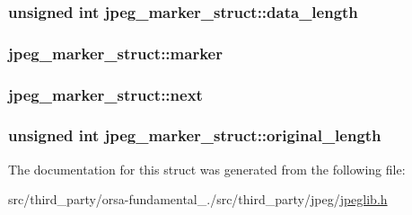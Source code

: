 \subsubsection[{data\+\_\+length}]{\setlength{\rightskip}{0pt plus 5cm}unsigned int jpeg\+\_\+marker\+\_\+struct\+::data\+\_\+length}\label{structjpeg__marker__struct_a98412e9bccde6954ce55f611ad146a6b}
\hypertarget{structjpeg__marker__struct_a154cf70fc9b4f86da631ca08a12a8d33}{}
\subsubsection[{marker}]{ jpeg\+\_\+marker\+\_\+struct\+::marker}\label{structjpeg__marker__struct_a154cf70fc9b4f86da631ca08a12a8d33}
\hypertarget{structjpeg__marker__struct_a1cb619806ea91b42a46b2a04fafabd82}{}
\subsubsection[{next}]{ jpeg\+\_\+marker\+\_\+struct\+::next}\label{structjpeg__marker__struct_a1cb619806ea91b42a46b2a04fafabd82}
\hypertarget{structjpeg__marker__struct_a3b17d58a17fa6be8560b697da814dfd3}{}
\subsubsection[{original\+\_\+length}]{\setlength{\rightskip}{0pt plus 5cm}unsigned int jpeg\+\_\+marker\+\_\+struct\+::original\+\_\+length}\label{structjpeg__marker__struct_a3b17d58a17fa6be8560b697da814dfd3}


The documentation for this struct was generated from the following file\+:\begin{DoxyCompactItemize}
\item 
src/third\+\_\+party/orsa-\/fundamental\+\_./src/third\+\_\+party/jpeg/\hyperlink{jpeglib_8h}{jpeglib.\+h}\end{DoxyCompactItemize}
